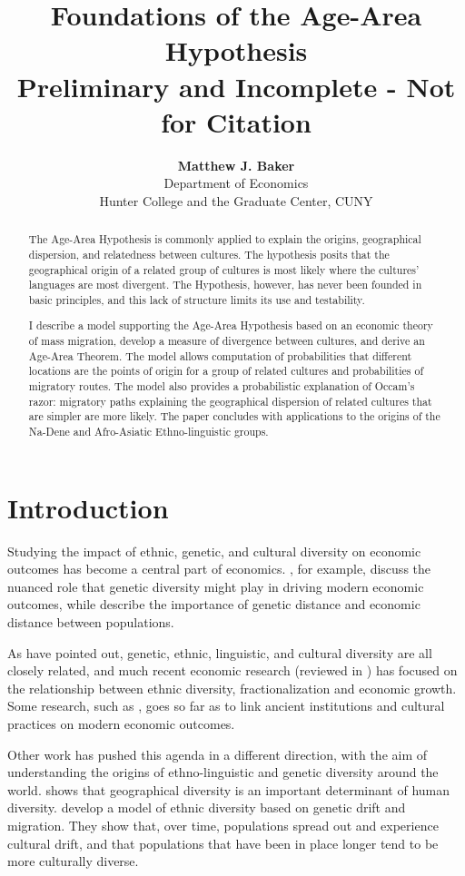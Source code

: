 \documentclass[11pt]{article}
\title{Foundations of the Age-Area Hypothesis \\ \large{Preliminary and Incomplete - Not for Citation}}
\author{\textbf{Matthew J. Baker} \\ Department of Economics \\ Hunter College and the Graduate Center, CUNY}
\begin{document}
\maketitle
\begin{abstract}
\noindent The Age-Area Hypothesis is commonly applied to explain the origins, geographical dispersion, and relatedness between cultures. The hypothesis posits that the geographical origin of a related group of cultures is most likely where the cultures' languages are most divergent. The Hypothesis, however, has never been founded in basic principles, and this lack of structure limits its use and testability. 

I describe a model supporting the Age-Area Hypothesis based on an economic theory of mass migration, develop a measure of divergence between cultures, and derive an Age-Area Theorem. The model allows computation of probabilities that different locations are the points of origin for a  group of related cultures and probabilities of migratory routes. The model also provides a probabilistic explanation of Occam's razor: migratory paths explaining the geographical dispersion of related cultures that are simpler are  more likely. The paper concludes with applications to the origins of the Na-Dene and Afro-Asiatic Ethno-linguistic groups. 
\end{abstract}
\newpage

\section{Introduction}
Studying the impact of ethnic, genetic, and cultural diversity on economic outcomes has become a central part of economics. \cite{ashraf13}, for example, discuss the nuanced role that genetic diversity might play in driving modern economic outcomes, while \cite{spolaore09} describe the importance of genetic distance and economic distance between populations. 

As \cite{cavalli95} have pointed out, genetic, ethnic, linguistic, and cultural diversity are all closely related, and much recent economic research (reviewed in \cite{alesina05}) has focused on the relationship between ethnic diversity, fractionalization and economic growth. Some research, such as \cite{spolaore13}, goes so far as to link ancient institutions and cultural practices on modern economic outcomes. 

Other work has pushed this agenda in a different direction, with the aim of understanding the origins of ethno-linguistic and genetic diversity around the world.   \cite{michalopoulos12} shows that geographical diversity is an important determinant of human diversity.  \cite{ahlerup12} develop a model of ethnic diversity based on genetic drift and migration. They show that, over time, populations spread out and experience cultural drift, and that populations that have been in place longer tend to be more culturally diverse. 
\end{document}
